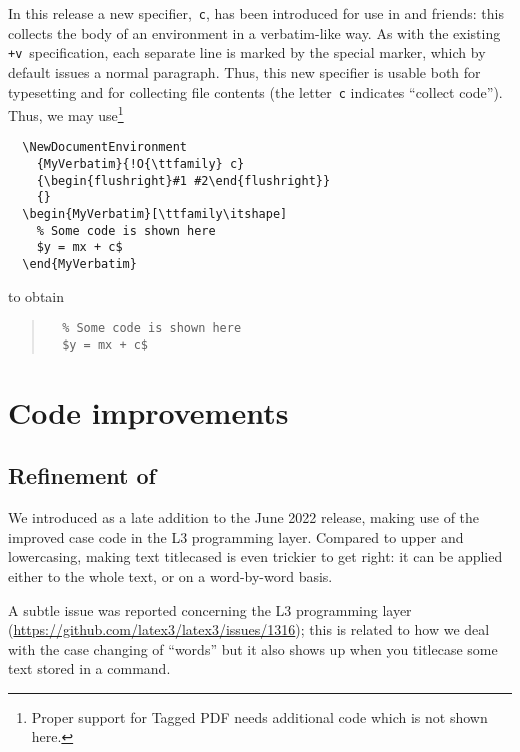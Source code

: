 \documentclass{ltnews}
\begin{document}
In this release a new specifier,~\texttt{c}, has been introduced for
use in  and friends: this collects the body
of an environment in a verbatim-like way.  As with the existing
\texttt{+v}~specification, each separate line is marked by the special
 marker, which
by default
issues a normal
paragraph. Thus, this new specifier is usable both for typesetting and
for collecting file contents (the letter~\texttt{c} indicates
\enquote{collect code}).  Thus, we may use\footnote{Proper support 
for Tagged PDF needs additional code which is not shown here.}
\begin{verbatim}
  \NewDocumentEnvironment
    {MyVerbatim}{!O{\ttfamily} c}
    {\begin{flushright}#1 #2\end{flushright}}
    {}
  \begin{MyVerbatim}[\ttfamily\itshape]
    % Some code is shown here
    $y = mx + c$
  \end{MyVerbatim}
\end{verbatim}
to obtain
\begin{quote}
\makeatletter
\def\@verbatim{%
  \trivlist
  \raggedleft
  \let \do \@makeother
  \dospecials
  \obeylines
  \normalfont \ttfamily \itshape
  \@noligs
}
\begin{verbatim}
  % Some code is shown here
  $y = mx + c$
\end{verbatim}
\end{quote}



\section{Code improvements}

\subsection{Refinement of }

We introduced  as a late addition to the June 2022
release, making use of the improved case code in the L3 programming
layer. Compared to upper and lowercasing, making text titlecased is even
trickier to get right: it can be applied either to the whole text, or
on a word-by-word basis.

A subtle issue was reported concerning the L3 programming layer
(\url{https://github.com/latex3/latex3/issues/1316}); this
is related to how we deal with the case changing of \enquote{words}
but it also shows up when you titlecase some text stored in a command.
\end{document}
